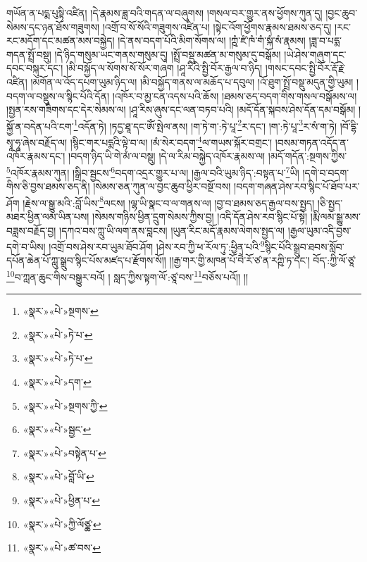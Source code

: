 གཡོན་ན་པདྨ་པུསྟི་འཛིན། །དེ་རྣམས་ཟླ་བའི་གདན་ལ་བཞུགས། །གསལ་བར་གྱུར་ནས་ཕྱོགས་ཀུན་དུ། །བྱང་ཆུབ་སེམས་དང་ཉན་ཐོས་གཟུགས། །འགྲོ་བ་སོ་སོའི་གཟུགས་འཛིན་པ། །སྟེང་འོག་ཕྱོགས་རྣམས་ཐམས་ཅད་དུ། །རང་རང་མདོག་དང་མཚན་མས་བསྐྱེད། །དེ་ནས་བདག་པོའི་མིག་སོགས་ལ། །ཀྵཾ་ཛཾ་ཁཾ་གཾ་སྐཾ་སཾ་རྣམས། །ཟླ་བ་པདྨ་གདན་སྤྲོ་བསྡུ། །དེ་ཉིད་གསུམ་ཡང་གནས་གསུམ་དུ། །སྤྲོ་བསྡུ་མཚན་མ་གསུམ་དུ་བསྒོམ། །ཡེ་ཤེས་གཞུག་དང་དབང་བསྐུར་དང་། །མི་བསྐྱོད་ལ་སོགས་སོ་སོར་གཞག །ཤཱ་རིའི་སྤྱི་བོར་རྒྱལ་བ་ཉིད། །གསང་དབང་སྤྱི་བོར་རྡོ་རྗེ་འཛིན། །མགོན་ལ་འོད་དཔག་ཡུམ་ཉིད་ལ། །མི་བསྐྱོད་གནས་ལ་མཆོད་པ་དབུལ། །འོ་ཐུག་སྤྲོ་བསྡུ་མདུན་གྱི་ཡུམ། །བདག་ལ་བསྡུས་ལ་སྙིང་པོའི་དོན། །འཁོར་བ་མྱ་ངན་འདས་པའི་ཆོས། །ཐམས་ཅད་བདག་གིས་གསལ་བསྒོམས་ལ། །སྤྱན་རས་གཟིགས་དང་དེར་སེམས་ལ། །ཤཱ་རིས་ཞུས་དང་ལན་བཏབ་པའི། །མདོ་དོན་སྐབས་ཤེས་དོན་དམ་བསྒོམ། །སྐྱོ་ན་བདེན་པའི་ངག་\footnote{«སྣར་»«པེ་»སྔགས་}འདོན་ཏེ། །ཏདྱ་ཐཱ་དང་ཨོཾ་སྤེལ་ནས། །ག་ཏེ་ག་:ཏེ་པཱ་\footnote{«སྣར་»«པེ་»ཏེ་པ་}ར་དང་། །ག་:ཏེ་པཱ་\footnote{«སྣར་»«པེ་»ཏེ་པ་}ར་སཾ་ག་ཏེ། །བོ་དྷི་སྭཱ་ཧཱ་ཞེས་བརྗོད་ལ། །སྙིང་གར་པདྨའི་ལྟེ་བ་ལ། །མཾ་སེར་བདག་\footnote{«སྣར་»«པེ་»དག་}ལ་གཡས་སྐོར་བགྲང་། །བསམ་གཏན་འདོད་ན་འཁོར་རྣམས་དང་། །བདག་ཉིད་ཡི་གེ་མཾ་ལ་བསྡུ། །དེ་ལ་རིམ་བསྐྱེད་འཁོར་རྣམས་ལ། །མདོ་གདོན་:སྔགས་ཀྱིས་\footnote{«སྣར་»«པེ་»སྔགས་ཀྱི་}འཁོར་རྣམས་ཀུན། །སྒྲིབ་སྦྱངས་\footnote{«སྣར་»«པེ་»སྦྱང་}བདག་འདྲར་གྱུར་པ་ལ། །རྒྱལ་བའི་ཡུམ་ཉིད་:བསྟན་པ་\footnote{«སྣར་»«པེ་»བསྟེན་པ་}ཡི། །དགེ་བ་བདག་གིས་ཅི་བྱས་ཐམས་ཅད་ནི། །སེམས་ཅན་ཀུན་ལ་བྱང་ཆུབ་ཕྱིར་བསྔོ་བས། །བདག་གཞན་ཤེས་རབ་སྙིང་པོ་ཐོབ་པར་ཤོག །རྗེས་ལ་སྒྱུ་མའི་:བློ་ཡིས་\footnote{«སྣར་»«པེ་»བློ་ཡི་}ལངས། །ལྷ་ཡི་སྣང་བ་ལ་གནས་ལ། །བྱ་བ་ཐམས་ཅད་རྒྱལ་བས་སྤྱད། །ཅི་སྤྱད་མཐར་ཕྱིན་ལམ་ཡིན་པས། །སེམས་གཉིས་ཕྱིན་དྲུག་སེམས་ཀྱིས་བྱ། །འདི་དོན་ཤེས་རབ་སྙིང་པོ་སྟེ། །རྨི་ལམ་སྒྱུ་མས་བཟླས་བརྗོད་བྱ། །དཀའ་བས་ཀླུ་ཡི་ལག་ནས་བླངས། །ཡུན་རིང་མདོ་རྣམས་ལེགས་སྤྱད་ལ། །རྒྱལ་ཡུམ་འདི་བྱས་དགེ་བ་ཡིས། །འགྲོ་བས་ཤེས་རབ་ཡུམ་ཐོབ་ཤོག །ཤེས་རབ་ཀྱི་ཕ་རོལ་ཏུ་:ཕྱིན་པའི་\footnote{«སྣར་»«པེ་»ཕྱིན་པ་}སྙིང་པོའི་སྒྲུབ་ཐབས་སློབ་དཔོན་ཆེན་པོ་ཀླུ་སྒྲུབ་སྙིང་པོས་མཛད་པ་རྫོགས་སོ།། །།རྒྱ་གར་གྱི་མཁན་པོ་བཻ་རོ་ཙ་ན་རཀྵི་ཏ་དང་། བོད་:ཀྱི་ལོ་ཙཱ་\footnote{«སྣར་»«པེ་»ཀྱི་ལོཙྪ་}བ་ཀླན་ཆུང་གིས་བསྒྱུར་བའོ། །
སླད་ཀྱིས་སྟག་ལོ་:ཙཱ་བས་\footnote{«སྣར་»«པེ་»ཚ་བས་}བཅོས་པའོ།། །།